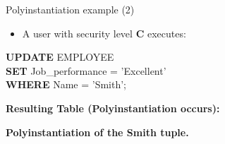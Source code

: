\begin{frame}{Polyinstantiation example (2)}
    \large %
    \begin{itemize}
        \item A user with security level \textbf{C} executes:
    \end{itemize}
    
    \vspace{0.1cm}
    \begin{flushleft}
        \ttfamily \textbf{UPDATE} EMPLOYEE \\
        \textbf{SET} Job\_performance = 'Excellent' \\
        \textbf{WHERE} Name = 'Smith';
    \end{flushleft}
    
    \vspace{0.03cm}
    \textbf{Resulting Table (Polyinstantiation occurs):}
    
    \begin{center}
    \vspace{-0.2cm} %
    \end{center}
    
    \vspace{0.05cm}
    \centering \normalsize \textbf{Polyinstantiation of the Smith tuple.}
\end{frame}

